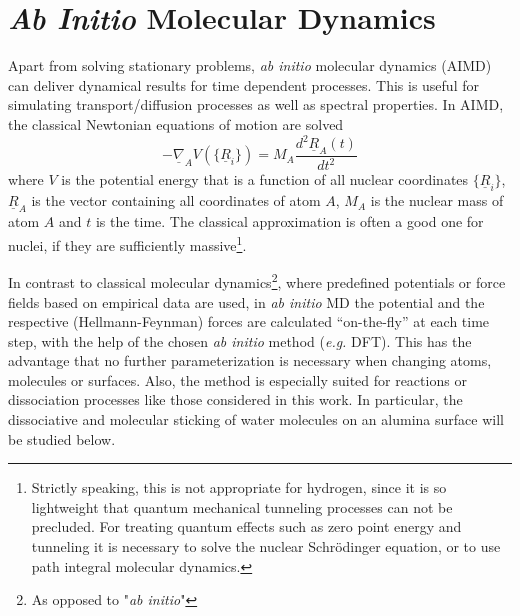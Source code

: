 \documentclass[11pt,DIV=13,BCOR=5mm,a4paper,headinclude]{scrbook}
\renewcommand{\vec}[1]{\underline{#1}}
\begin{document}
\section{\textit{Ab Initio} Molecular Dynamics}
Apart from solving stationary problems, \textit{ab initio} molecular dynamics (AIMD) can deliver dynamical results for time dependent processes\cite{jensen,marx_hutter_AIMD}.
This is useful for simulating transport/diffusion processes as well as spectral properties.
In AIMD, the classical Newtonian equations of motion are solved
\begin{equation}
 -\vec{\nabla}_A V(\{\vec{R}_i\})=M_A\frac{d^2 \vec{R}_A(t)}{dt^2}
\end{equation}
where $V$ is the potential energy that is a function of all nuclear coordinates $\{\vec{R}_i\}$, $\vec{R}_A$ is the vector containing all coordinates of atom $A$, $M_A$ is the nuclear mass of atom $A$ and $t$ is the time.
The classical approximation is often a good one for nuclei, if they are sufficiently massive\footnote{Strictly speaking, this is not appropriate for hydrogen, since it is so lightweight that quantum mechanical tunneling processes can not be precluded.
For treating quantum effects such as zero point energy and tunneling it is necessary to solve the nuclear Schrödinger equation, or to use path integral molecular dynamics\cite{Marx1996}.}.


In contrast to classical molecular dynamics\footnote{As opposed to "\textit{ab initio}"}, where predefined potentials or force fields based on empirical data are used, in \textit{ab initio} MD the potential and the respective (Hellmann-Feynman) forces are calculated ``on-the-fly'' at each time step, with the help of the chosen \textit{ab initio} method (\textit{e.g.} DFT).
This has the advantage that no further parameterization is necessary when changing atoms, molecules or surfaces.
Also, the method is especially suited for reactions or dissociation processes like those considered in this work.
In particular, the dissociative and molecular sticking of water molecules on an alumina surface will be studied below.
\end{document}
